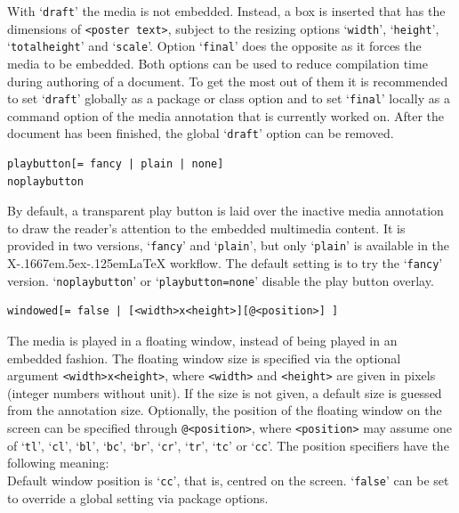 \documentclass[a4paper]{article}
\def\XeLaTeX{X\kern-.1667em\lower.5ex\hbox{\reflectbox{E}}\kern-.125em\LaTeX}
\begin{document}
With `\verb+draft+' the media is not embedded. Instead, a box is inserted that has the dimensions of \verb+<poster text>+, subject to the resizing options `\verb+width+', `\verb+height+', `\verb+totalheight+' and `\verb+scale+'. Option `\verb+final+' does the opposite as it forces the media to be embedded. Both options can be used to reduce compilation time during authoring of a document. To get the most out of them it is recommended to set `\verb+draft+' globally as a package or class option and to set `\verb+final+' locally as a command option of the media annotation that is currently worked on. After the document has been finished, the global `\verb+draft+' option can be removed.
\begin{verbatim}
playbutton[= fancy | plain | none]
noplaybutton
\end{verbatim}
By default, a transparent play button is laid over the inactive media annotation to draw the reader's attention to the embedded multimedia content. It is provided in two versions, `\verb+fancy+' and `\verb+plain+', but only `\verb+plain+' is available in the \XeLaTeX{} workflow. The default setting is to try the `\verb+fancy+' version. `\verb+noplaybutton+' or `\verb+playbutton=none+' disable the play button overlay.
\begin{verbatim}
windowed[= false | [<width>x<height>][@<position>] ]
\end{verbatim}
The media is played in a floating window, instead of being played in an embedded fashion. The floating window size is specified via the optional argument \verb+<width>x<height>+, where \verb+<width>+ and \verb+<height>+ are given in pixels (integer numbers without unit). If the size is not given, a default size is guessed from the annotation size. Optionally, the position of the floating window on the screen can be specified through \verb+@<position>+, where \verb+<position>+ may assume one of `\verb+tl+', `\verb+cl+', `\verb+bl+', `\verb+bc+', `\verb+br+', `\verb+cr+', `\verb+tr+', `\verb+tc+' or `\verb+cc+'. The position specifiers have the following meaning:\\[0.5ex]
Default window position is `\verb+cc+', that is, centred on the screen. `\verb+false+' can be set to override a global setting via package options.
\end{document}
